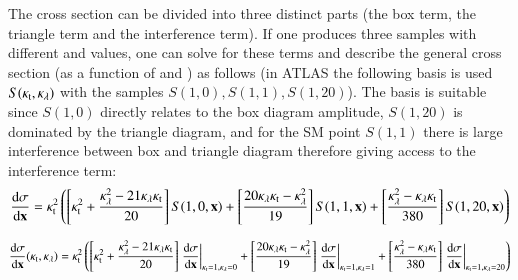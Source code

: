The cross section can be divided into three distinct parts (the box
term, the triangle term and the interference term). If one produces
three samples with different \ktop and \klambda values, one can solve
for these terms and describe the general cross section (as a function
of \ktop and \klambda) as follows (in ATLAS the following basis is
used $S(\kappa_\text{t}, \kappa_{\lambda})$ with the samples
$S(1, 0), S(1, 1), S(1, 20)$). The basis is suitable since $S(1, 0)$
directly relates to the box diagram amplitude, $S(1, 20)$ is dominated
by the triangle diagram, and for the SM point $S(1, 1)$ there is large
interference between box and triangle diagram therefore giving access
to the interference term:
\begin{align*}
  \frac{\mathrm{d}\sigma}{\mathrm{d}\mathbf{x}} = \kappa_\text{t}^2 \left(
  \left[ \kappa_\text{t}^2 + \frac{\kappa_{\lambda}^2 - 21 \kappa_{\lambda} \kappa_\text{t}}{20} \right] S(1, 0, \mathbf{x})
  + \left[ \frac{20 \kappa_{\lambda} \kappa_\text{t} - \kappa_{\lambda}^2}{19} \right] S(1, 1, \mathbf{x})
  + \left[ \frac{\kappa_{\lambda}^2 - \kappa_{\lambda} \kappa_\text{t}}{380}  \right] S(1, 20, \mathbf{x})
  \right)
\end{align*}


\begin{align*}
  \frac{\mathrm{d}\sigma}{\mathrm{d}\mathbf{x}} (\kappa_\text{t}, \kappa_{\lambda}) = \kappa_\text{t}^2 \left(
  \left[ \kappa_\text{t}^2 + \frac{\kappa_{\lambda}^2 - 21 \kappa_{\lambda} \kappa_\text{t}}{20} \right] \left. \frac{\mathrm{d}\sigma}{\mathrm{d}\mathbf{x}} \right|_{\kappa_\text{t} = 1, \kappa_{\lambda} = 0}
  + \left[ \frac{20 \kappa_{\lambda} \kappa_\text{t} - \kappa_{\lambda}^2}{19} \right] \left. \frac{\mathrm{d}\sigma}{\mathrm{d}\mathbf{x}} \right|_{\kappa_\text{t} = 1, \kappa_{\lambda} = 1}
  + \left[ \frac{\kappa_{\lambda}^2 - \kappa_{\lambda} \kappa_\text{t}}{380}  \right] \left. \frac{\mathrm{d}\sigma}{\mathrm{d}\mathbf{x}} \right|_{\kappa_\text{t} = 1, \kappa_{\lambda} = 20}
  \right)
\end{align*}




